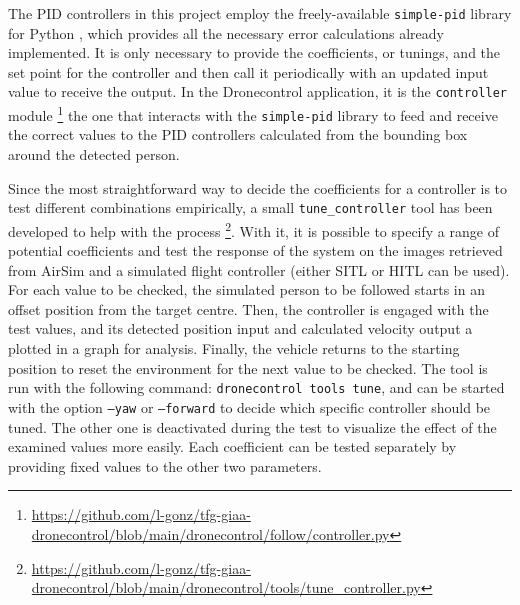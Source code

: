 The PID controllers in this project employ the freely-available \texttt{simple-pid} library for Python \cite{pid-library}, which provides all the necessary error calculations already implemented.
It is only necessary to provide the coefficients, or tunings, and the set point for the controller and then call it periodically with an updated input value to receive the output.
In the Dronecontrol application, it is the \texttt{controller} module \footnote{\url{https://github.com/l-gonz/tfg-giaa-dronecontrol/blob/main/dronecontrol/follow/controller.py}} the one that interacts with the \texttt{simple-pid} library to feed and receive the correct values to the PID controllers calculated from the bounding box around the detected person.

Since the most straightforward way to decide the coefficients for a controller is to test different combinations empirically, a small \texttt{tune\_controller} tool has been developed to help with the process \footnote{\url{https://github.com/l-gonz/tfg-giaa-dronecontrol/blob/main/dronecontrol/tools/tune_controller.py}}.
With it, it is possible to specify a range of potential coefficients and test the response of the system on the images retrieved from AirSim and a simulated flight controller (either SITL or HITL can be used).
For each value to be checked, the simulated person to be followed starts in an offset position from the target centre.
Then, the controller is engaged with the test values, and its detected position input and calculated velocity output a plotted in a graph for analysis.
Finally, the vehicle returns to the starting position to reset the environment for the next value to be checked.
The tool is run with the following command: \texttt{dronecontrol tools tune}, and can be started with the option \texttt{--yaw} or \texttt{--forward} to decide which specific controller should be tuned.
The other one is deactivated during the test to visualize the effect of the examined values more easily.
Each coefficient can be tested separately by providing fixed values to the other two parameters.


